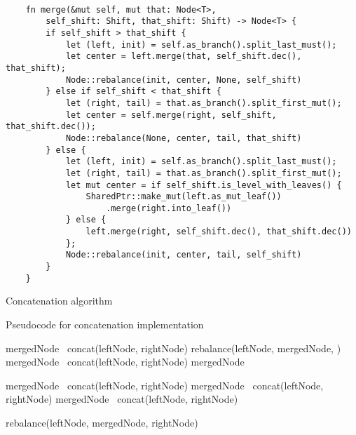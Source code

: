 \begin{listing}[ht!]

    \begin{verbatim}

    fn merge(&mut self, mut that: Node<T>,
        self_shift: Shift, that_shift: Shift) -> Node<T> {
        if self_shift > that_shift {
            let (left, init) = self.as_branch().split_last_must();
            let center = left.merge(that, self_shift.dec(), that_shift);
            Node::rebalance(init, center, None, self_shift)
        } else if self_shift < that_shift {
            let (right, tail) = that.as_branch().split_first_mut();
            let center = self.merge(right, self_shift, that_shift.dec());
            Node::rebalance(None, center, tail, that_shift)
        } else {
            let (left, init) = self.as_branch().split_last_must();
            let (right, tail) = that.as_branch().split_first_mut();
            let mut center = if self_shift.is_level_with_leaves() {
                SharedPtr::make_mut(left.as_mut_leaf())
                    .merge(right.into_leaf())
            } else {
                left.merge(right, self_shift.dec(), that_shift.dec())
            };
            Node::rebalance(init, center, tail, self_shift)
        }
    }

    \end{verbatim}

    \caption{Concatenation algorithm}
    \label{lst:rrb-tree-concat}
\end{listing}

\begin{listing}[ht!]
    \caption{Pseudocode for concatenation implementation}
    \label{lst:rrb-tree-concat}

    \begin{algorithmic}[1]
                \State mergedNode \la\ concat(leftNode, rightNode)
                \State \Return rebalance(leftNode, mergedNode, \nil{})
                \State mergedNode \la\ concat(leftNode, rightNode)
                \State \Return {}
            \Else
                \State mergedNode \la\ \nil{}

                    \State mergedNode \la\ concat(leftNode, rightNode)
                \Else
                        \State mergedNode \la\ concat(leftNode, rightNode)
                    \Else
                        \State mergedNode \la\ concat(leftNode, rightNode)
                    \EndIf
                \EndIf

                \State \Return rebalance(leftNode, mergedNode, rightNode)
            \EndIf
        \EndFunction
    \end{algorithmic}

\end{listing}
